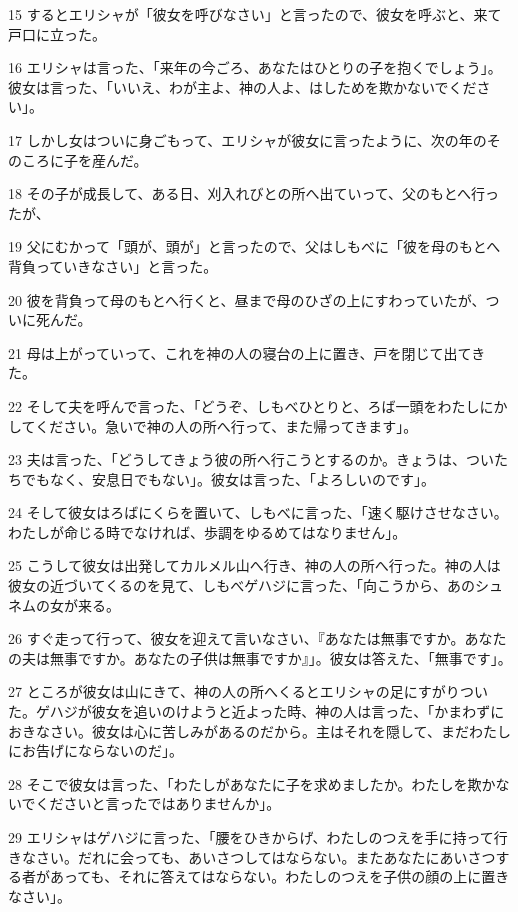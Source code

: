 \par 15 するとエリシャが「彼女を呼びなさい」と言ったので、彼女を呼ぶと、来て戸口に立った。
\par 16 エリシャは言った、「来年の今ごろ、あなたはひとりの子を抱くでしょう」。彼女は言った、「いいえ、わが主よ、神の人よ、はしためを欺かないでください」。
\par 17 しかし女はついに身ごもって、エリシャが彼女に言ったように、次の年のそのころに子を産んだ。
\par 18 その子が成長して、ある日、刈入れびとの所へ出ていって、父のもとへ行ったが、
\par 19 父にむかって「頭が、頭が」と言ったので、父はしもべに「彼を母のもとへ背負っていきなさい」と言った。
\par 20 彼を背負って母のもとへ行くと、昼まで母のひざの上にすわっていたが、ついに死んだ。
\par 21 母は上がっていって、これを神の人の寝台の上に置き、戸を閉じて出てきた。
\par 22 そして夫を呼んで言った、「どうぞ、しもべひとりと、ろば一頭をわたしにかしてください。急いで神の人の所へ行って、また帰ってきます」。
\par 23 夫は言った、「どうしてきょう彼の所へ行こうとするのか。きょうは、ついたちでもなく、安息日でもない」。彼女は言った、「よろしいのです」。
\par 24 そして彼女はろばにくらを置いて、しもべに言った、「速く駆けさせなさい。わたしが命じる時でなければ、歩調をゆるめてはなりません」。
\par 25 こうして彼女は出発してカルメル山へ行き、神の人の所へ行った。神の人は彼女の近づいてくるのを見て、しもべゲハジに言った、「向こうから、あのシュネムの女が来る。
\par 26 すぐ走って行って、彼女を迎えて言いなさい、『あなたは無事ですか。あなたの夫は無事ですか。あなたの子供は無事ですか』」。彼女は答えた、「無事です」。
\par 27 ところが彼女は山にきて、神の人の所へくるとエリシャの足にすがりついた。ゲハジが彼女を追いのけようと近よった時、神の人は言った、「かまわずにおきなさい。彼女は心に苦しみがあるのだから。主はそれを隠して、まだわたしにお告げにならないのだ」。
\par 28 そこで彼女は言った、「わたしがあなたに子を求めましたか。わたしを欺かないでくださいと言ったではありませんか」。
\par 29 エリシャはゲハジに言った、「腰をひきからげ、わたしのつえを手に持って行きなさい。だれに会っても、あいさつしてはならない。またあなたにあいさつする者があっても、それに答えてはならない。わたしのつえを子供の顔の上に置きなさい」。

